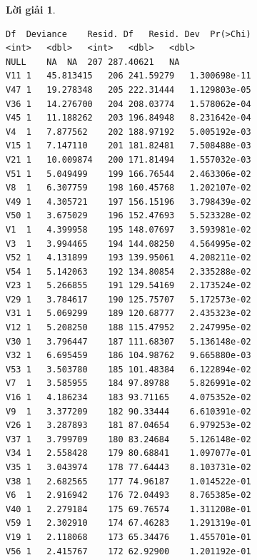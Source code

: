 \documentclass[14pt, a4paper]{article}
\theoremstyle{sltheorem}
\theoremstyle{soltheorem}
\newtheorem*{loigiai}{Lời giải}
\begin{document}
\begin{loigiai}
    \begin{verbatim}
Df	Deviance	Resid. Df	Resid. Dev	Pr(>Chi)
<int>	<dbl>	<int>	<dbl>	<dbl>
NULL	NA	NA	207	287.40621	NA
V11	1	45.813415	206	241.59279	1.300698e-11
V47	1	19.278348	205	222.31444	1.129803e-05
V36	1	14.276700	204	208.03774	1.578062e-04
V45	1	11.188262	203	196.84948	8.231642e-04
V4	1	7.877562	202	188.97192	5.005192e-03
V15	1	7.147110	201	181.82481	7.508488e-03
V21	1	10.009874	200	171.81494	1.557032e-03
V51	1	5.049499	199	166.76544	2.463306e-02
V8	1	6.307759	198	160.45768	1.202107e-02
V49	1	4.305721	197	156.15196	3.798439e-02
V50	1	3.675029	196	152.47693	5.523328e-02
V1	1	4.399958	195	148.07697	3.593981e-02
V3	1	3.994465	194	144.08250	4.564995e-02
V52	1	4.131899	193	139.95061	4.208211e-02
V54	1	5.142063	192	134.80854	2.335288e-02
V23	1	5.266855	191	129.54169	2.173524e-02
V29	1	3.784617	190	125.75707	5.172573e-02
V31	1	5.069299	189	120.68777	2.435323e-02
V12	1	5.208250	188	115.47952	2.247995e-02
V30	1	3.796447	187	111.68307	5.136148e-02
V32	1	6.695459	186	104.98762	9.665880e-03
V53	1	3.503780	185	101.48384	6.122894e-02
V7	1	3.585955	184	97.89788	5.826991e-02
V16	1	4.186234	183	93.71165	4.075352e-02
V9	1	3.377209	182	90.33444	6.610391e-02
V26	1	3.287893	181	87.04654	6.979253e-02
V37	1	3.799709	180	83.24684	5.126148e-02
V34	1	2.558428	179	80.68841	1.097077e-01
V35	1	3.043974	178	77.64443	8.103731e-02
V38	1	2.682565	177	74.96187	1.014522e-01
V6	1	2.916942	176	72.04493	8.765385e-02
V40	1	2.279184	175	69.76574	1.311208e-01
V59	1	2.302910	174	67.46283	1.291319e-01
V19	1	2.118068	173	65.34476	1.455701e-01
V56	1	2.415767	172	62.92900	1.201192e-01
    \end{verbatim}


\end{loigiai}
\end{document}
